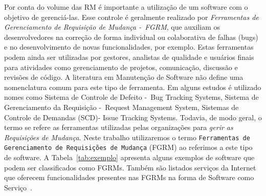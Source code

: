 Por conta do volume das RM é importante a utilização de um software com o
objetivo de gerenciá-las. Esse controle é geralmente realizado por
\textit{Ferramentas de Gerenciamento de Requisição de Mudança -~FGRM}, que
auxiliam os desenvolvedores na correção de forma individual ou colaborativa de
falhas (bugs) e no desenvolvimento de novas funcionalidades, por exemplo. Estas
ferramentas podem ainda ser utilizadas por gestores, analistas de qualidade e
usuários finais para atividades como gerenciamento de projetos, comunicação,
discussão e revisões de código. A literatura em Manutenção de Software não
define uma nomenclatura comum para este tipo de ferramenta. Em alguns estudos é
utilizado nomes como Sistema de Controle de Defeito -~Bug Tracking Systems,
Sistema de Gerenciamento da Requisição -~Request Management System, Sistemas de
Controle de Demandas (SCD)- Issue Tracking Systems. Todavia, de modo geral, o
termo se refere as ferramentas utilizadas pelas organizações para \textit{gerir
    as Requisições de Mudança}. Neste trabalho utilizaremos o termo
\texttt{Ferramentas de Gerenciamento de Requisições de Mudança} (FGRM) ao
referimos a este tipo de software. A Tabela~\ref{tab:exemplo} apresenta alguns
exemplos de software que podem ser classificados como FGRMs. Também são listados
serviços da Internet que oferecem funcionalidades presentes nas FGRMs na forma
de Software como Serviço~\cite{fox2013engineering}.

\begin{table}[htpb]
\centering
{}
\caption{Exemplos de ferramentas e serviços da Internet. Adaptado
		de~\cite{cavalcanti2014challenges}}
\label{tab:exemplo}
\end{table}

